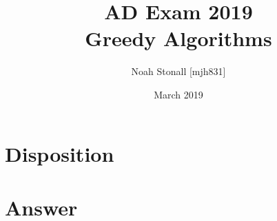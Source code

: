 \documentclass{article}
\title{AD Exam 2019 \\ Greedy Algorithms}
\author{Noah Stonall [mjh831]}
\date{March 2019}
\begin{document}
\maketitle

\section*{Disposition}

\newpage
\section*{Answer}

\end{document}
